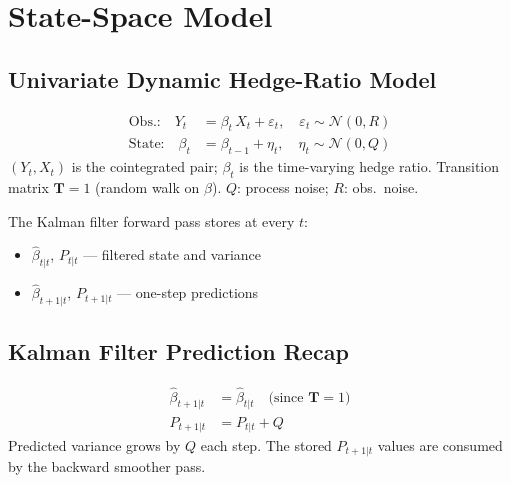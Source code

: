 \documentclass[10pt,a4paper,twocolumn]{article}
\begin{document}
\section{State-Space Model}

\subsection{Univariate Dynamic Hedge-Ratio Model}

\begin{tcolorbox}[mathbox={State-Space Model (scalar)}]
\vspace{-4pt}
\begin{align}
  \text{Obs.:}\quad
    Y_t &= \beta_t\,X_t + \varepsilon_t,
    \quad \varepsilon_t \sim \mathcal{N}(0, R) \label{eq:obs}\\
  \text{State:}\quad
    \beta_t &= \beta_{t-1} + \eta_t,
    \quad \eta_t \sim \mathcal{N}(0, Q) \label{eq:state}
\end{align}
\vspace{-4pt}
$(Y_t, X_t)$ is the cointegrated pair; $\beta_t$ is the time-varying
hedge ratio.  Transition matrix $\mathbf{T}=1$ (random walk on $\beta$).
$Q$: process noise; $R$: obs.\ noise.
\end{tcolorbox}

The Kalman filter forward pass stores at every $t$:
\begin{itemize}\setlength\itemsep{0pt}
  \item $\hat{\beta}_{t|t}$, $P_{t|t}$ --- filtered state and variance
  \item $\hat{\beta}_{t+1|t}$, $P_{t+1|t}$ --- one-step predictions
\end{itemize}

\subsection{Kalman Filter Prediction Recap}

\begin{tcolorbox}[mathbox={KF Prediction (forward pass)}]
\vspace{-4pt}
\begin{align}
  \hat{\beta}_{t+1|t} &= \hat{\beta}_{t|t}
    \quad\text{(since $\mathbf{T}=1$)} \\
  P_{t+1|t} &= P_{t|t} + Q
\end{align}
\vspace{-4pt}
Predicted variance grows by $Q$ each step.  The stored
$P_{t+1|t}$ values are consumed by the backward smoother pass.
\end{tcolorbox}
\end{document}
